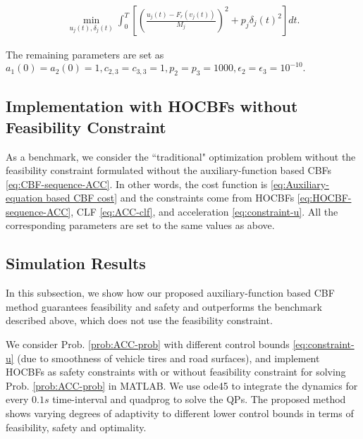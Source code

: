 \documentclass[letterpaper, 10 pt, conference]{ieeeconf}
\theoremstyle{definition}
\begin{document}
 \begin{small}
\begin{equation}
\label{eq:Auxiliary-equation based CBF cost}
\begin{split}
\min_{u_{j}(t),\delta_{j}(t)} \int_{0}^{T}[(\frac{u_{j}(t)-F_{r}(v_{j}(t))}{M_{j}})^{2}+p_{j}\delta_{j}(t)^{2}]dt.
\end{split}
\end{equation}
\end{small}
The remaining parameters are set as $a_{1}(0)=a_{2}(0)=1, c_{2,3}=c_{3,3}=1, p_{2}=p_{3}=1000,\epsilon_{2}=\epsilon_{3}=10^{-10}.$

\subsection{Implementation with HOCBFs without Feasibility Constraint}

As a benchmark, we consider the ``traditional" optimization problem without the feasibility constraint formulated without the auxiliary-function based CBFs \eqref{eq:CBF-sequence-ACC}. In other words, the cost function is   \eqref{eq:Auxiliary-equation based CBF cost} and the constraints come from HOCBFs \eqref{eq:HOCBF-sequence-ACC}, CLF \eqref{eq:ACC-clf}, and acceleration \eqref{eq:constraint-u}.  All the corresponding parameters are set to the same values as above. 

\subsection{Simulation Results}

In this subsection, we show how our proposed auxiliary-function based CBF method guarantees feasibility and safety and outperforms the benchmark described above, which does not use the feasibility constraint. 

We consider Prob. \ref{prob:ACC-prob} with different control bounds \eqref{eq:constraint-u} (due to smoothness of vehicle tires and road surfaces), and implement HOCBFs as safety constraints with or without feasibility constraint for solving Prob. \ref{prob:ACC-prob} in MATLAB. We use ode45 to integrate the dynamics for every $0.1s$ time-interval and quadprog to solve the QPs. The proposed method shows varying degrees of adaptivity to different lower control bounds in terms of feasibility, safety and optimality.
\end{document}
